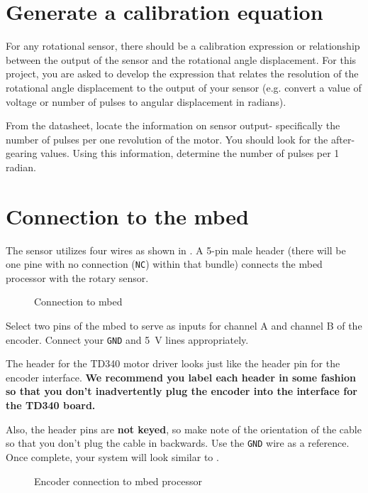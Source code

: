 \documentclass{exam}
\begin{document}
\section{Generate a calibration equation}
For any rotational sensor, there should be a calibration expression or relationship between the output of the sensor and the rotational angle displacement.  For this project, you are asked to develop the expression that relates the resolution of the rotational angle displacement to the output of your sensor (e.g. convert a value of voltage or number of pulses to angular displacement in radians).  

From the datasheet, locate the information on sensor output- specifically the number of pulses per one revolution of the motor.  You should look for the after-gearing values.  Using this information, determine the number of pulses per 1 radian.  




\section{Connection to the mbed}
The sensor utilizes four wires as shown in . A 5-pin male header (there will be one pine with no connection (\lstinline{NC}) within that bundle) connects the mbed processor with the rotary sensor. 
\begin{figure}[h]
\caption{Connection to mbed}
\label{fig:2}
\end{figure}

Select two pins of the mbed to serve as inputs for channel A and channel B of the encoder. Connect your \lstinline{GND} and \SI{5}{\volt} lines appropriately. 

The header for the TD340 motor driver looks just like the header pin for the encoder interface. \textbf{We recommend you label each header in some fashion so that you don’t inadvertently plug the encoder into the interface for the TD340 board.} 

Also, the header pins are \textbf{not keyed}, so make note of the orientation of the cable so that you don’t plug the cable in backwards. Use the \lstinline{GND} wire as a reference. 
Once complete, your system will look similar to . 
\begin{figure}
\caption{Encoder connection to mbed processor}
\label{fig:3}
\end{figure}



                                                             
\end{document}
